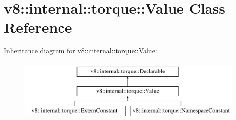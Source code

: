 \hypertarget{classv8_1_1internal_1_1torque_1_1Value}{}\section{v8\+:\+:internal\+:\+:torque\+:\+:Value Class Reference}
\label{classv8_1_1internal_1_1torque_1_1Value}
Inheritance diagram for v8\+:\+:internal\+:\+:torque\+:\+:Value\+:\begin{figure}[H]
\begin{center}
\leavevmode
\includegraphics[height=3.000000cm]{classv8_1_1internal_1_1torque_1_1Value}
\end{center}
\end{figure}
